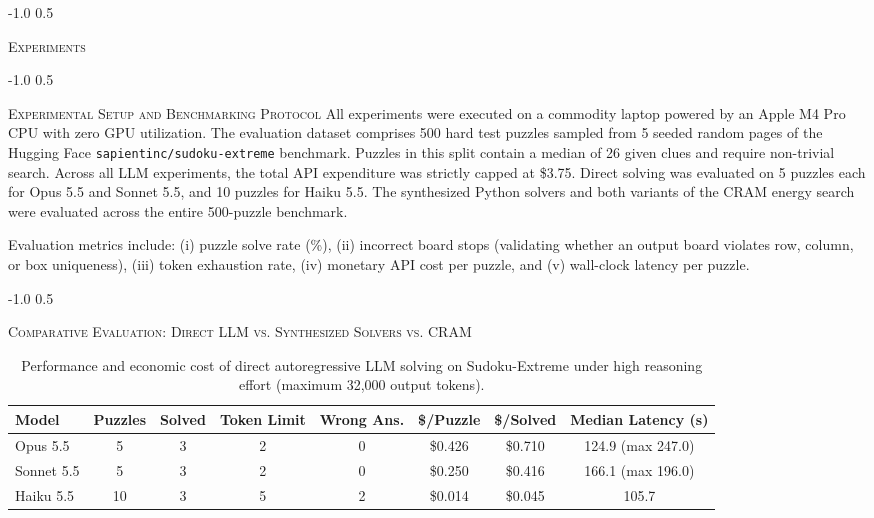 \documentclass{article} %
\makeatletter
\renewcommand{\section}{\@startsection{section}{1}{\z@}%
  {-1.0\baselineskip}%
  {0.5\baselineskip}%
  {\normalfont\fontsize{12}{14}\selectfont\raggedright\scshape}}
\renewcommand{\subsection}{\@startsection{subsection}{2}{\z@}%
  {-1.0\baselineskip}%
  {0.5\baselineskip}%
  {\normalfont\fontsize{10}{11}\selectfont\raggedright\scshape}}
\makeatother
\begin{document}
\section{\textsc{Experiments}}
\label{sec:experiments}

\subsection{\textsc{Experimental Setup and Benchmarking Protocol}}
All experiments were executed on a commodity laptop powered by an Apple M4 Pro CPU with zero GPU utilization. The evaluation dataset comprises 500 hard test puzzles sampled from 5 seeded random pages of the Hugging Face \texttt{sapientinc/sudoku-extreme} benchmark. Puzzles in this split contain a median of 26 given clues and require non-trivial search. Across all LLM experiments, the total API expenditure was strictly capped at \$3.75. Direct solving was evaluated on 5 puzzles each for Opus 5.5 and Sonnet 5.5, and 10 puzzles for Haiku 5.5. The synthesized Python solvers and both variants of the CRAM energy search were evaluated across the entire 500-puzzle benchmark.

Evaluation metrics include: (i) puzzle solve rate (\%), (ii) incorrect board stops (validating whether an output board violates row, column, or box uniqueness), (iii) token exhaustion rate, (iv) monetary API cost per puzzle, and (v) wall-clock latency per puzzle.

\subsection{\textsc{Comparative Evaluation: Direct LLM vs. Synthesized Solvers vs. CRAM}}
\label{sec:comp_eval}

\begin{table}[t]
\caption{Performance and economic cost of direct autoregressive LLM solving on Sudoku-Extreme under high reasoning effort (maximum 32,000 output tokens).}
\label{tab:llm_direct}
\begin{center}
\begin{tabular}{lccccccc}
\toprule
\textbf{Model} & \textbf{Puzzles} & \textbf{Solved} & \textbf{Token Limit} & \textbf{Wrong Ans.} & \textbf{\$/Puzzle} & \textbf{\$/Solved} & \textbf{Median Latency (s)} \\
\midrule
Opus 5.5   & 5  & 3 & 2 & 0 & \$0.426 & \$0.710 & 124.9 (max 247.0) \\
Sonnet 5.5 & 5  & 3 & 2 & 0 & \$0.250 & \$0.416 & 166.1 (max 196.0) \\
Haiku 5.5  & 10 & 3 & 5 & 2 & \$0.014 & \$0.045 & 105.7 \\
\bottomrule
\end{tabular}
\end{center}
\end{table}
\end{document}

